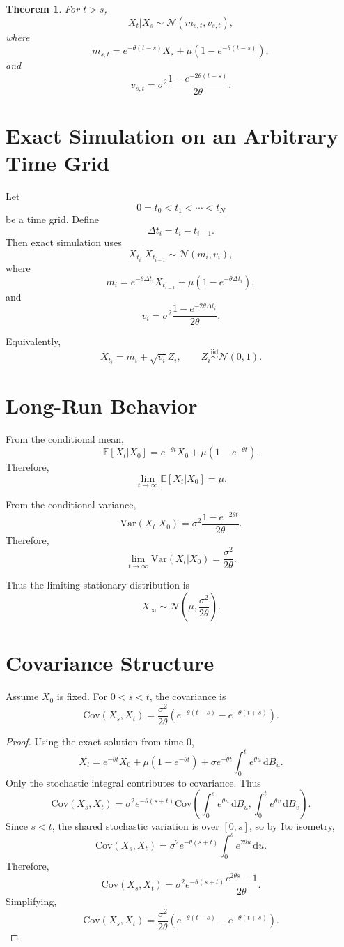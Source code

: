 \documentclass[12pt,oneside]{book}
\numberwithin{equation}{section}
\theoremstyle{definition}
\theoremstyle{plain}
\newtheorem{theorem}{Theorem}[section]
\theoremstyle{remark}
\newcommand{\E}{\mathbb{E}}
\newcommand{\Var}{\mathrm{Var}}
\newcommand{\Cov}{\mathrm{Cov}}
\newcommand{\iid}{\overset{\text{iid}}{\sim}}
\newcommand{\dd}{\,\mathrm{d}}
\newcommand{\Normal}{\mathcal{N}}
\begin{document}
\begin{theorem}
For $t>s$,
\[
X_t|X_s
\sim
\Normal(m_{s,t},v_{s,t}),
\]
where
\[
m_{s,t}
=
e^{-\theta(t-s)}X_s+\mu(1-e^{-\theta(t-s)}),
\]
and
\[
v_{s,t}
=
\sigma^2\frac{1-e^{-2\theta(t-s)}}{2\theta}.
\]
\end{theorem}

\section{Exact Simulation on an Arbitrary Time Grid}

Let
\[
0=t_0<t_1<\cdots<t_N
\]
be a time grid. Define
\[
\Delta t_i=t_i-t_{i-1}.
\]
Then exact simulation uses
\[
X_{t_i}|X_{t_{i-1}}
\sim
\Normal(m_i,v_i),
\]
where
\[
m_i
=
e^{-\theta\Delta t_i}X_{t_{i-1}}
+
\mu(1-e^{-\theta\Delta t_i}),
\]
and
\[
v_i
=
\sigma^2
\frac{1-e^{-2\theta\Delta t_i}}{2\theta}.
\]

Equivalently,
\[
X_{t_i}
=
m_i+\sqrt{v_i}Z_i,
\qquad
Z_i\iid \Normal(0,1).
\]

\section{Long-Run Behavior}

From the conditional mean,
\[
\E[X_t|X_0]
=
e^{-\theta t}X_0+\mu(1-e^{-\theta t}).
\]
Therefore,
\[
\lim_{t\to\infty}\E[X_t|X_0]=\mu.
\]

From the conditional variance,
\[
\Var(X_t|X_0)
=
\sigma^2\frac{1-e^{-2\theta t}}{2\theta}.
\]
Therefore,
\[
\lim_{t\to\infty}\Var(X_t|X_0)
=
\frac{\sigma^2}{2\theta}.
\]

Thus the limiting stationary distribution is
\[
X_\infty
\sim
\Normal\left(\mu,\frac{\sigma^2}{2\theta}\right).
\]

\section{Covariance Structure}

Assume $X_0$ is fixed. For $0<s<t$, the covariance is
\[
\Cov(X_s,X_t)
=
\frac{\sigma^2}{2\theta}
\left(
e^{-\theta(t-s)}-e^{-\theta(t+s)}
\right).
\]

\begin{proof}
Using the exact solution from time $0$,
\[
X_t
=
e^{-\theta t}X_0+\mu(1-e^{-\theta t})
+
\sigma e^{-\theta t}\int_0^t e^{\theta u}\dd B_u.
\]
Only the stochastic integral contributes to covariance. Thus
\[
\Cov(X_s,X_t)
=
\sigma^2 e^{-\theta(s+t)}
\Cov\left(
\int_0^s e^{\theta u}\dd B_u,
\int_0^t e^{\theta v}\dd B_v
\right).
\]
Since $s<t$, the shared stochastic variation is over $[0,s]$, so by Ito isometry,
\[
\Cov(X_s,X_t)
=
\sigma^2 e^{-\theta(s+t)}
\int_0^s e^{2\theta u}\dd u.
\]
Therefore,
\[
\Cov(X_s,X_t)
=
\sigma^2 e^{-\theta(s+t)}
\frac{e^{2\theta s}-1}{2\theta}.
\]
Simplifying,
\[
\Cov(X_s,X_t)
=
\frac{\sigma^2}{2\theta}
\left(
e^{-\theta(t-s)}-e^{-\theta(t+s)}
\right).
\]
\end{proof}
\end{document}

